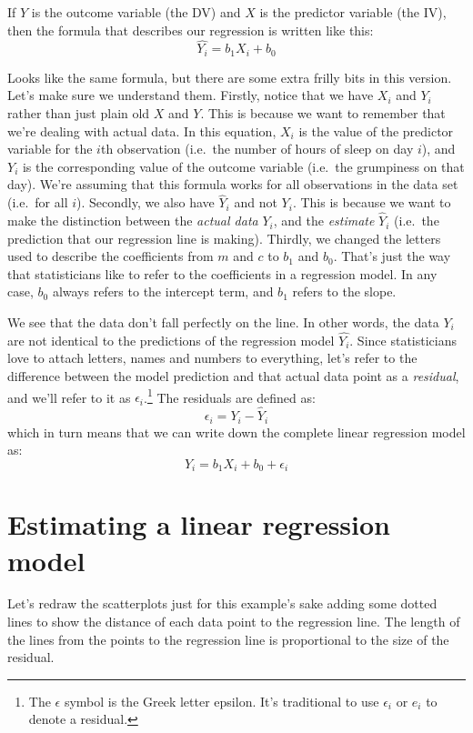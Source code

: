 \documentclass[
]{book}
\theoremstyle{definition}
\theoremstyle{definition}
\theoremstyle{definition}
\theoremstyle{definition}
\theoremstyle{remark}
\begin{document}
If \(Y\) is the outcome variable (the DV) and \(X\) is the predictor variable (the IV), then the formula that describes our regression is written like this:
\[
\hat{Y_i} = b_1 X_i + b_0
\]

Looks like the same formula, but there are some extra frilly bits in this version. Let's make sure we understand them. Firstly, notice that we have \(X_i\) and \(Y_i\) rather than just plain old \(X\) and \(Y\). This is because we want to remember that we're dealing with actual data. In this equation, \(X_i\) is the value of the predictor variable for the \(i\)th observation (i.e.~the number of hours of sleep on day \(i\)), and \(Y_i\) is the corresponding value of the outcome variable (i.e.~the grumpiness on that day). We're assuming that this formula works for all observations in the data set (i.e.~for all \(i\)). Secondly, we also have \(\hat{Y}_i\) and not \(Y_i\). This is because we want to make the distinction between the \emph{actual data} \(Y_i\), and the \emph{estimate} \(\hat{Y}_i\) (i.e.~the prediction that our regression line is making). Thirdly, we changed the letters used to describe the coefficients from \(m\) and \(c\) to \(b_1\) and \(b_0\). That's just the way that statisticians like to refer to the coefficients in a regression model. In any case, \(b_0\) always refers to the intercept term, and \(b_1\) refers to the slope.

We see that the data don't fall perfectly on the line. In other words, the data \(Y_i\) are not identical to the predictions of the regression model \(\hat{Y_i}\). Since statisticians love to attach letters, names and numbers to everything, let's refer to the difference between the model prediction and that actual data point as a \emph{residual}, and we'll refer to it as \(\epsilon_i\).\footnote{The \(\epsilon\) symbol is the Greek letter epsilon. It's traditional to use \(\epsilon_i\) or \(e_i\) to denote a residual.} The residuals are defined as:
\[
\epsilon_i = Y_i - \hat{Y}_i
\]
which in turn means that we can write down the complete linear regression model as:
\[
Y_i = b_1 X_i + b_0 + \epsilon_i
\]

\hypertarget{regressionestimation}{%
\section{Estimating a linear regression model}\label{regressionestimation}}

Let's redraw the scatterplots just for this example's sake adding some dotted lines to show the distance of each data point to the regression line. The length of the lines from the points to the regression line is proportional to the size of the residual.
\end{document}
